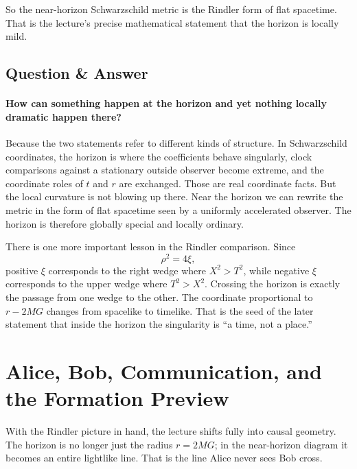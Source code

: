 So the near-horizon Schwarzschild metric is the Rindler form of flat spacetime. That is the lecture's precise mathematical statement that the horizon is locally mild.

\subsection{Question \& Answer}

\paragraph{How can something happen at the horizon and yet nothing locally dramatic happen there?}

Because the two statements refer to different kinds of structure. In Schwarzschild coordinates, the horizon is where the coefficients behave singularly, clock comparisons against a stationary outside observer become extreme, and the coordinate roles of \(t\) and \(r\) are exchanged. Those are real coordinate facts. But the local curvature is not blowing up there. Near the horizon we can rewrite the metric in the form of flat spacetime seen by a uniformly accelerated observer. The horizon is therefore globally special and locally ordinary.

There is one more important lesson in the Rindler comparison. Since
\begin{equation}
\rho^{2}=4\xi,
\end{equation}
positive \(\xi\) corresponds to the right wedge where \(X^{2}>T^{2}\), while negative \(\xi\) corresponds to the upper wedge where \(T^{2}>X^{2}\). Crossing the horizon is exactly the passage from one wedge to the other. The coordinate proportional to \(r-2MG\) changes from spacelike to timelike. That is the seed of the later statement that inside the horizon the singularity is ``a time, not a place.''

\section{Alice, Bob, Communication, and the Formation Preview}

With the Rindler picture in hand, the lecture shifts fully into causal geometry. The horizon is no longer just the radius \(r=2MG\); in the near-horizon diagram it becomes an entire lightlike line. That is the line Alice never sees Bob cross.


